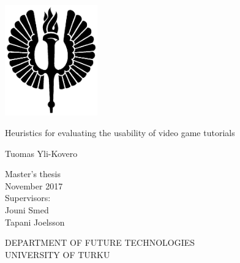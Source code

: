 \documentclass[12pt, a4paper]{report}
\begin{document}
\pagestyle{empty}
\begin{center}
	\includegraphics[width=4cm]{soihtu.png}
\end{center}
\vspace{3.0cm}
\begin{center}\large
Heuristics for evaluating the usability of video game tutorials
\end{center}


\vspace{0.5cm}
\begin{center}
	Tuomas Yli-Kovero
\end{center}

\vspace{0.5cm}
\begin{center}
	Master's thesis\\
	November 2017\\
	\bigbreak
	Supervisors:\\
	Jouni Smed\\
	Tapani Joelsson
\end{center}

\vspace{4.0cm}
\begin{center}
	DEPARTMENT OF FUTURE TECHNOLOGIES\\
	UNIVERSITY OF TURKU\\
\end{center}
\end{document}
